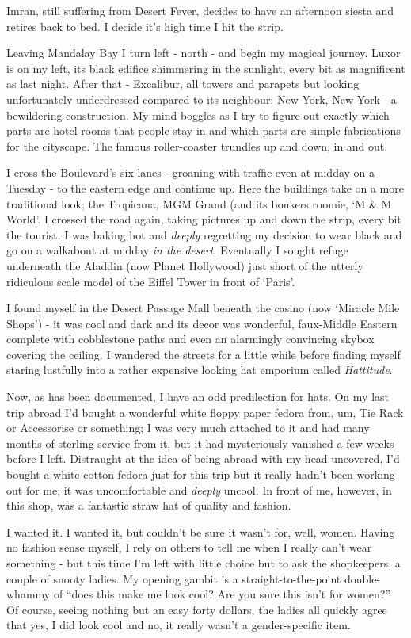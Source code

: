 \documentclass[a5paper,titlepage,draft]{book}
\begin{document}
Imran, still suffering from Desert Fever, decides to have an afternoon siesta and retires back to bed.  I decide it's high time I hit the strip.

Leaving Mandalay Bay I turn left - north - and begin my magical journey.  Luxor is on my left, its black edifice shimmering in the sunlight, every bit as magnificent as last night.  After that - Excalibur, all towers and parapets but looking unfortunately underdressed compared to its neighbour: New York, New York - a bewildering construction.  My mind boggles as I try to figure out exactly which parts are hotel rooms that people stay in and which parts are simple fabrications for the cityscape.  The famous roller-coaster trundles up and down, in and out.

I cross the Boulevard's six lanes - groaning with traffic even at midday on a Tuesday - to the eastern edge and continue up. Here the buildings take on a more traditional look; the Tropicana, MGM Grand (and its bonkers roomie, `M \& M World'.  I crossed the road again, taking pictures up and down the strip, every bit the tourist.  I was baking hot and \emph{deeply} regretting my decision to wear black and go on a walkabout at midday \emph{in the desert}.  Eventually I sought refuge underneath the Aladdin (now Planet Hollywood) just short of the utterly ridiculous scale model of the Eiffel Tower in front of `Paris'.

I found myself in the Desert Passage Mall beneath the casino (now `Miracle Mile Shops') - it was cool and dark and its decor was wonderful, faux-Middle Eastern complete with cobblestone paths and even an alarmingly convincing skybox covering the ceiling.  I wandered the streets for a little while before finding myself staring lustfully into a rather expensive looking hat emporium called \emph{Hattitude}.

Now, as has been documented, I have an odd predilection for hats.  On my last trip abroad I'd bought a wonderful white floppy paper fedora from, um, Tie Rack or Accessorise or something; I was very much attached to it and had many months of sterling service from it, but it had mysteriously vanished a few weeks before I left.  Distraught at the idea of being abroad with my head uncovered, I'd bought a white cotton fedora just for this trip but it really hadn't been working out for me; it was uncomfortable and \emph{deeply} uncool.  In front of me, however, in this shop, was a fantastic straw hat of quality and fashion.

I wanted it.  I wanted it, but couldn't be sure it wasn't for, well, women.  Having no fashion sense myself, I rely on others to tell me when I really can't wear something - but this time I'm left with little choice but to ask the shopkeepers, a couple of snooty ladies.  My opening gambit is a straight-to-the-point double-whammy of ``does this make me look cool?  Are you sure this isn't for women?''  Of course, seeing nothing but an easy forty dollars, the ladies all quickly agree that yes, I did look cool and no, it really wasn't a gender-specific item.
\end{document}
